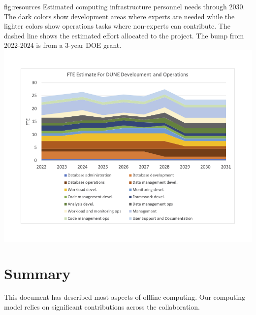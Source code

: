 \documentclass[../main-v1.tex]{subfiles}
\begin{document}
\begin{dunefigure}
{fig:resources}
{Estimated computing infrastructure personnel needs through 2030.  The dark colors show development areas where experts are needed while the lighter colors show operations tasks where non-experts can contribute. The dashed line shows the estimated effort allocated to the project.  The bump from 2022-2024 is from a 3-year DOE grant.}
{\includegraphics[width=0.9 \textwidth]{graphics/Resources/FTENeeds-2022-02-redo.png}}
\end{dunefigure}
\section{Summary}

This document has described most aspects of  offline computing. Our computing model relies on significant contributions across the collaboration.  


\end{document}
